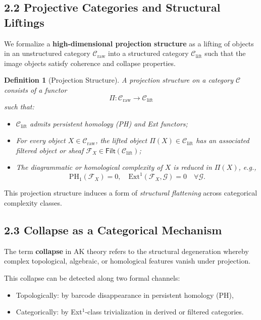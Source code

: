 \documentclass[11pt]{article}
\newtheorem{definition}[theorem]{Definition}
\begin{document}
\subsection*{2.2 Projective Categories and Structural Liftings}

We formalize a \textbf{high-dimensional projection structure} as a lifting of objects in an unstructured category \( \mathcal{C}_{\text{raw}} \)  
into a structured category \( \mathcal{C}_{\text{lift}} \) such that the image objects satisfy coherence and collapse properties.

\begin{definition}[Projection Structure]
A projection structure on a category \( \mathcal{C} \) consists of a functor
\[
\Pi : \mathcal{C}_{\text{raw}} \to \mathcal{C}_{\text{lift}}
\]
such that:
\begin{itemize}
  \item \( \mathcal{C}_{\text{lift}} \) admits persistent homology (PH) and Ext functors;
  \item For every object \( X \in \mathcal{C}_{\text{raw}} \), the lifted object \( \Pi(X) \in \mathcal{C}_{\text{lift}} \)  
        has an associated filtered object or sheaf \( \mathcal{F}_X \in \mathsf{Filt}(\mathcal{C}_{\text{lift}}) \);
  \item The diagrammatic or homological complexity of \( X \) is reduced in \( \Pi(X) \), e.g.,
        \[
        \mathrm{PH}_1(\mathcal{F}_X) = 0, \quad \mathrm{Ext}^1(\mathcal{F}_X, \mathcal{G}) = 0 \quad \forall \mathcal{G}.
        \]
\end{itemize}
\end{definition}

This projection structure induces a form of \emph{structural flattening} across categorical complexity classes.

\subsection*{2.3 Collapse as a Categorical Mechanism}

The term \textbf{collapse} in AK theory refers to the structural degeneration whereby complex topological,  
algebraic, or homological features vanish under projection.

This collapse can be detected along two formal channels:

\begin{itemize}
  \item Topologically: by barcode disappearance in persistent homology (PH),
  \item Categorically: by Ext$^1$-class trivialization in derived or filtered categories.
\end{itemize}
\end{document}
